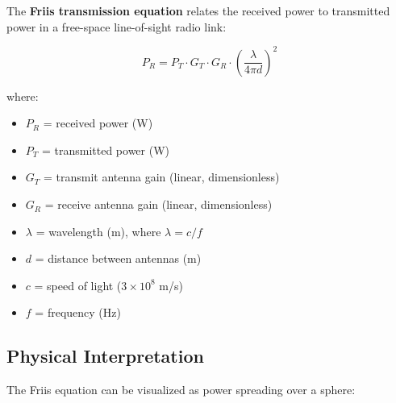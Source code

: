 The \textbf{Friis transmission equation} relates the received power to transmitted power in a free-space line-of-sight radio link:

\begin{equation}
P_R = P_T \cdot G_T \cdot G_R \cdot \left(\frac{\lambda}{4\pi d}\right)^2
\label{eq:friis}
\end{equation}

where:
\begin{itemize}
\item $P_R$ = received power (W)
\item $P_T$ = transmitted power (W)
\item $G_T$ = transmit antenna gain (linear, dimensionless)
\item $G_R$ = receive antenna gain (linear, dimensionless)
\item $\lambda$ = wavelength (m), where $\lambda = c/f$
\item $d$ = distance between antennas (m)
\item $c$ = speed of light ($3 \times 10^8$ m/s)
\item $f$ = frequency (Hz)
\end{itemize}

\subsection{Physical Interpretation}

The Friis equation can be visualized as power spreading over a sphere:

\begin{center}
\end{center}

